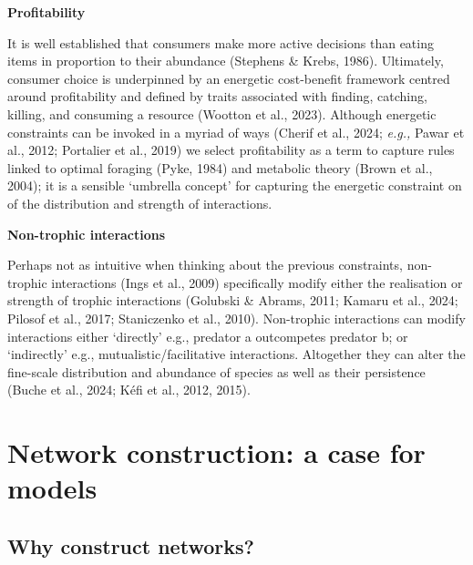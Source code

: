 \documentclass[
]{article}
\begin{document}
\textbf{Profitability}

It is well established that consumers make more active decisions than
eating items in proportion to their abundance (Stephens \& Krebs, 1986).
Ultimately, consumer choice is underpinned by an energetic cost-benefit
framework centred around profitability and defined by traits associated
with finding, catching, killing, and consuming a resource (Wootton et
al., 2023). Although energetic constraints can be invoked in a myriad of
ways (Cherif et al., 2024; \emph{e.g.,} Pawar et al., 2012; Portalier et
al., 2019) we select profitability as a term to capture rules linked to
optimal foraging (Pyke, 1984) and metabolic theory (Brown et al., 2004);
it is a sensible `umbrella concept' for capturing the energetic
constraint on of the distribution and strength of interactions.

\textbf{Non-trophic interactions}

Perhaps not as intuitive when thinking about the previous constraints,
non-trophic interactions (Ings et al., 2009) specifically modify either
the realisation or strength of trophic interactions (Golubski \& Abrams,
2011; Kamaru et al., 2024; Pilosof et al., 2017; Staniczenko et al.,
2010). Non-trophic interactions can modify interactions either
`directly' e.g., predator a outcompetes predator b; or `indirectly'
e.g., mutualistic/facilitative interactions. Altogether they can alter
the fine-scale distribution and abundance of species as well as their
persistence (Buche et al., 2024; Kéfi et al., 2012, 2015).

\section{Network construction: a case for models}\label{sec-construct}

\subsection{Why construct networks?}\label{why-construct-networks}
\end{document}
